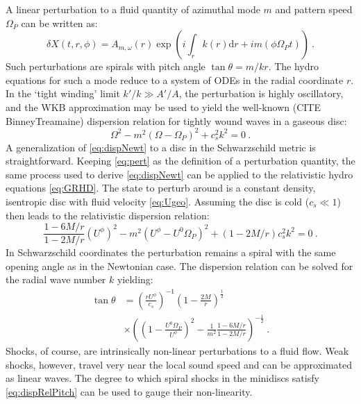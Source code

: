\documentclass{emulateapj}
\newcommand{\dd}{\mbox{d}}
\begin{document}
A linear perturbation to a fluid quantity of azimuthal mode $m$ and pattern speed $\Omega_P$ can be written as:
\begin{equation}
	\delta X(t, r, \phi) = A_{m,\omega}(r) \exp \left( i \int_r k(r) \dd r  + i m (\phi \Omega_P t) \right)\ . \label{eq:pert}
\end{equation}
Such perturbations are spirals with pitch angle $\tan \theta = m / k r$. The hydro equations for such a mode reduce to a system of ODEs in the radial coordinate $r$.  In the `tight winding' limit $k' / k \gg A'/A$, the perturbation is highly oscillatory, and the WKB approximation may be used to yield the well-known (CITE BinneyTreamaine) dispersion relation for tightly wound waves in a gaseous disc:
\begin{equation}
	\Omega^2 - m^2(\Omega-\Omega_P)^2 + c_s^2 k^2 = 0 \ . \label{eq:dispNewt}
\end{equation}
A generalization of \eqref{eq:dispNewt} to a disc in the Schwarzschild metric is straightforward. Keeping \eqref{eq:pert} as the definition of a perturbation quantity, the same process used to derive \eqref{eq:dispNewt} can be applied to the relativistic hydro equations \eqref{eq:GRHD}. The state to perturb around is a constant density, isentropic disc with fluid velocity \eqref{eq:Ugeo}.  Assuming the disc is cold ($c_s \ll 1$) then leads to the relativistic dispersion relation:
\begin{equation}
	\frac{1-6M/r}{1-2M/r}\left(U^\phi\right)^2 - m^2(U^\phi-U^0\Omega_P)^2 + \left(1-2M/r\right) c_s^2 k^2 = 0 \ . \label{eq:dispRel}
\end{equation}
In Schwarzschild coordinates the perturbation remains a spiral with the same opening angle as in the Newtonian case.  The dispersion relation can be solved for the radial wave number $k$ yielding:
\begin{align}
	\tan \theta &= \left( \frac{r U^\phi}{c_s} \right)^{-1} \left(1-\frac{2M}{r}\right)^{\frac{1}{2}} \label{eq:dispRelPitch} \\ \nonumber
		&\times \left(\left(1- \frac{U^0 \Omega_P}{U^\phi}\right)^2 - \frac{1}{m^2}\frac{1-6M/r}{1-2M/r}\right)^{-\frac{1}{2}}\ . 
\end{align}
Shocks, of course, are intrinsically non-linear perturbations to a fluid flow.  Weak shocks, however, travel very near the local sound speed and can be approximated as linear waves.  The degree to which spiral shocks in the minidiscs satisfy \eqref{eq:dispRelPitch} can be used to gauge their non-linearity.  
\end{document}
